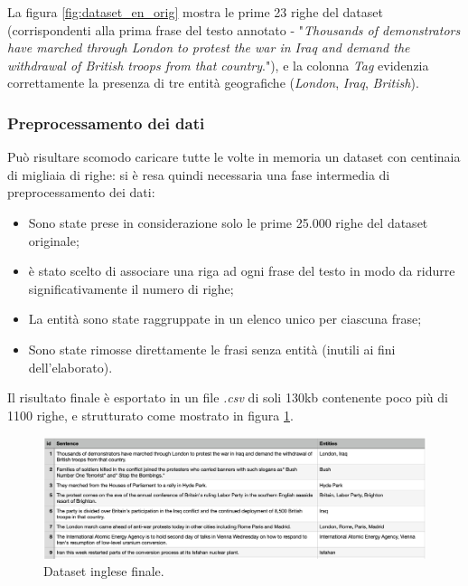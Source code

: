 \documentclass[a4paper,11pt]{article}
\begin{document}
La figura \ref{fig:dataset_en_orig} mostra le prime 23 righe del dataset (corrispondenti alla prima frase del testo annotato - "\textit{Thousands of demonstrators have marched through London to protest the war in Iraq and demand the withdrawal of British troops from that country}."), e la colonna \textit{Tag}  evidenzia correttamente la presenza di tre entità geografiche (\textit{London}, \textit{Iraq}, \textit{British}).

\subsubsection{Preprocessamento dei dati}
Può risultare scomodo caricare tutte le volte in memoria un dataset con centinaia di migliaia di righe: si è resa quindi necessaria una fase intermedia di preprocessamento dei dati:

\begin{itemize}
	\item Sono state prese in considerazione solo le prime 25.000 righe del dataset originale;
	\item è stato scelto di associare una riga ad ogni frase del testo in modo da ridurre significativamente il numero di righe;
	\item La entità sono state raggruppate in un elenco unico per ciascuna frase;
	\item Sono state rimosse direttamente le frasi senza entità (inutili ai fini dell'elaborato).
\end{itemize}

Il risultato finale è esportato in un file \textit{.csv} di soli 130kb contenente poco più di 1100 righe, e strutturato come mostrato in figura \ref{fig:dataset_en_cleaned}.
\newline
\begin{figure}[H]
\centering
\includegraphics[width=1\textwidth]{img/dataset-en-cleaned}
\caption{Dataset inglese finale.}
\label{fig:dataset_en_cleaned}
\end{figure}

\end{document}

